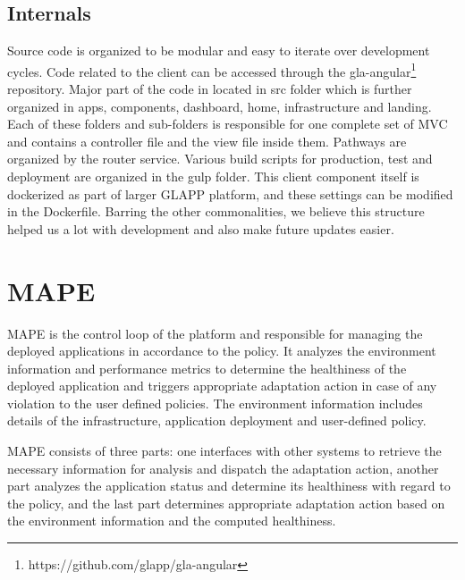 \documentclass{seal_thesis}
\begin{document}
\subsection{Internals}

Source code is organized to be modular and easy to iterate over development cycles. 
Code related to the client can be accessed through the gla-angular\footnote{https://github.com/glapp/gla-angular} repository.
Major part of the code in located in src folder which is further organized in apps, components, dashboard, home, infrastructure and landing. 
Each of these folders and sub-folders is responsible for one complete set of MVC and contains a controller file and the view file inside them. 
Pathways are organized by the router service. 
Various build scripts for production, test and deployment are organized in the gulp folder. 
This client component itself is dockerized as part of larger GLAPP platform, and these settings can be modified in the Dockerfile. 
Barring the other commonalities, we believe this structure helped us a lot with development and also make future updates easier.


\section{MAPE}
MAPE is the control loop of the platform and responsible for managing the deployed applications in accordance to the policy.
It analyzes the environment information and performance metrics to determine the healthiness of the deployed application and triggers appropriate adaptation action in case of any violation to the user defined policies.
The environment information includes details of the infrastructure, application deployment and user-defined policy.

MAPE consists of three parts: one interfaces with other systems to retrieve the necessary information for analysis and dispatch the adaptation action, another part analyzes the application status and determine its healthiness with regard to the policy, and the last part determines appropriate adaptation action based on the environment information and the computed healthiness.
\end{document}
